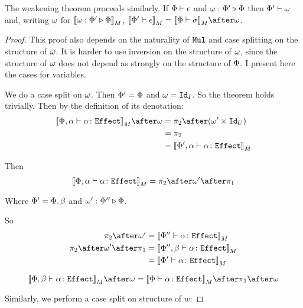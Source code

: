 \documentclass{Report}
\begin{document}
\begin{theorem}\label{EffWeakeningEff}
    The weakening theorem proceeds similarly. If $\wellformed{\P}{\e}$ and $\wrelw{\P'}{\P}$ then $\wellformed{\P'}{\w}$ and, writing $\w$ for $\deno{\wrelw{\P'}{\P}}$,  $\deno{\wellformed{\P'}{\e}} = \deno{\wellformed{\P}{\si}}\after\w$.

\end{theorem}

\begin{proof}
    This proof also depends on the naturality of $\Mul$ and case splitting on the structure of $\w$. It is harder to use inversion on the structure of $\w$, since the structure of $\w$ does not depend as strongly on the structure of $\P$. I present here the cases for variables.

    We do a case split on $\w$.
    \subcase{$\w = \i$}
    Then $\P' = \P$ and $\w = \Id{I}$. So the theorem holds trivially.
    Then by the definition of its denotation:    
    \begin{align}
        \deno{\typerelation{\P,\a}{\a}{\effect}}\after\w &= \pp\after(\w'\times \Id{U}) \\
        & = \pp\\
        & = \deno{\typerelation{\P',\a}{\a}{\effect}}
    \end{align}
    
    Then \begin{equation}
        \deno{\typerelation{\P,\a}{\a}{\effect}} = \pp\after\w'\after\p
    \end{equation}
    
    Where $\P' = \P,\b$ and $\wrel{\w'}{\P''}{\P}$.
    
    So\begin{align}
        \pp\after\w' & = \deno{\typerelation{\P''}{\a}{\effect}}
        \\
        \pp\after\w'\after\p & =\deno{\typerelation{\P'',\b}{\a}{\effect}}\\
        &= \deno{\typerelation{\P'}{\a}{\effect}}
    \end{align}
    
    \begin{equation}
        \deno{\typerelation{\P,\b}{\a}{\effect}}\after\w = \deno{\typerelation{\P}{\a}{\effect}}\after\p\after\w
    \end{equation}
    
    Similarly, we perform a case split on structure of $w$:
    

\end{proof}
\end{document}

